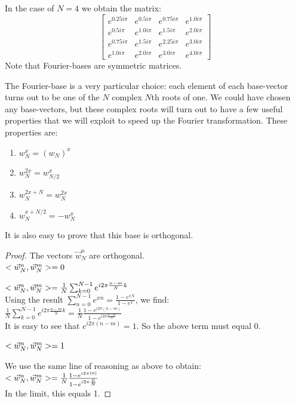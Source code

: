 In the case of $N = 4$ we obtain the matrix:
$$ \left[\begin{matrix}e^{0.25 i \pi} & e^{0.5 i \pi} & e^{0.75 i \pi} & e^{1.0 i \pi}\\e^{0.5 i \pi} & e^{1.0 i \pi} & e^{1.5 i \pi} & e^{2.0 i \pi}\\e^{0.75 i \pi} & e^{1.5 i \pi} & e^{2.25 i \pi} & e^{3.0 i \pi}\\e^{1.0 i \pi} & e^{2.0 i \pi} & e^{3.0 i \pi} & e^{4.0 i \pi}\end{matrix}\right] $$
Note that Fourier-bases are symmetric matrices. 

The Fourier-base is a very particular choice: each element of each base-vector turns out to be one of the $N$ complex $N$th roots of one. We could have chosen any base-vectors, but these complex roots will turn out to have a few useful properties that we will exploit to speed up the Fourier transformation. These properties are:

\begin{enumerate}
    \item $w_N^x = (w_N)^x$
    \item $w_N^{2x} = w_{N/2}^x$
    \item $w_N^{2x+N} = w_N^{2x}$
    \item $w_N^{x+N/2} = - w_N^x$
\end{enumerate}

It is also easy to prove that this base is orthogonal.
\begin{proof} The vectors $\vec{w}_N^n$ are orthogonal. \\
    {$< \vec{w}_N^n , \vec{w}_N^m > = 0$ }{
    
    $< \vec{w}_N^n , \vec{w}_N^m > = \frac{1}{N} \sum_{k=0}^{N-1} e^{i 2\pi \frac{n-m}{N} k} $ \\
    
    Using the result $\sum_{n=0}^{N-1} e^{xn} = \frac{1-e^{xN}}{1-e^{x}}$, we find: \\
    
    $\frac{1}{N} \sum_{k=0}^{N-1} e^{i 2\pi \frac{n-m}{N} k} = \frac{1}{N} \frac{1-e^{i 2\pi (n-m)}}{1-e^{i 2\pi \frac{n-m}{N}}}$ \\
    
    It is easy to see that $e^{i 2\pi (n-m)} = 1$. So the above term must equal 0.
    
    
}
    {$< \vec{w}_N^n , \vec{w}_N^m > = 1$ }{

    We use the same line of reasoning as above to obtain: \\
    
    $ < \vec{w}_N^n , \vec{w}_N^m > = \frac{1}{N} \frac{1-e^{i 2\pi (0)}}{1-e^{i 2\pi \frac{0}{N}}}$ \\
    
    In the limit, this equals 1.
}
\end{proof}



